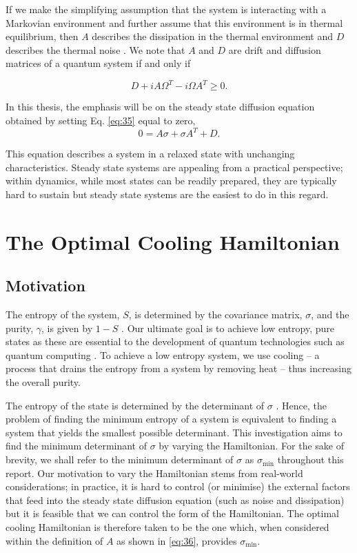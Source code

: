 \documentclass[11pt,a4paper]{article}
\numberwithin{equation}{section}
\begin{document}
	If we make the simplifying assumption that the system is interacting with a Markovian environment and further assume that this environment is in thermal equilibrium, then $A$ describes the dissipation in the thermal environment and $D$ describes the thermal noise \cite{Serafini17}. We note that $A$ and $D$ are drift and diffusion matrices of a quantum system if and only if \cite{Serafini17}
	
	\begin{equation} \label{eq:37}
	D + iA \Omega^T - i\Omega A^T \geq 0.
	\end{equation}
		
	In this thesis, the emphasis will be on the steady state diffusion equation obtained by setting Eq. \ref{eq:35} equal to zero,
	\begin{equation} \label{eq:38}
	0 = A\sigma +\sigma A^{T} + D.
	\end{equation}
	
	This equation describes a system in a relaxed state with unchanging characteristics. Steady state systems are appealing from a practical perspective; within dynamics, while most states can be readily prepared, they are typically hard to sustain but steady state systems are the easiest to do in this regard.
	
	
	\section{The Optimal Cooling Hamiltonian}
	
	\subsection{Motivation}
	The entropy of the system, $S$, is determined by the covariance matrix, $\sigma$, and the purity, $\gamma$, is given by $1-S$ \cite{Genoni16}. Our ultimate goal is to achieve low entropy, pure states as these are essential to the development of quantum technologies such as quantum computing \cite{Chuang}. To achieve a low entropy system, we use cooling -- a process that drains the entropy from a system by removing heat -- thus increasing the overall purity.
	
	The entropy of the state is determined by the determinant of $\sigma$ \cite{Genoni16}. Hence, the problem of finding the minimum entropy of a system is equivalent to finding a system that yields the smallest possible determinant. This investigation aims to find the minimum determinant of $\sigma$ by varying the Hamiltonian. For the sake of brevity, we shall refer to the minimum determinant of $\sigma$ as $\sigma_\text{min}$ throughout this report. Our motivation to vary the Hamiltonian stems from real-world considerations; in practice, it is hard to control (or minimise) the external factors that feed into the steady state diffusion equation (such as noise and dissipation) but it is feasible that we can control the form of the Hamiltonian. The optimal cooling Hamiltonian is therefore taken to be the one which, when considered within the definition of $A$ as shown in \ref{eq:36}, provides $\sigma_\text{min}$. 
	
\end{document}
